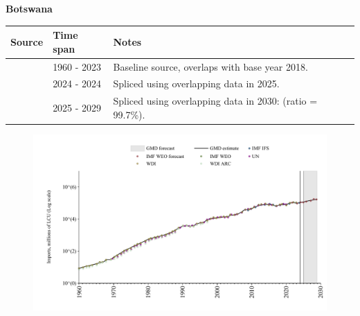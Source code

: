 \documentclass[12pt,a4paper,landscape]{article}
\begin{document}
\begin{adjustbox}{max totalsize={\paperwidth}{\paperheight},center}
\begin{minipage}[t][\textheight][t]{\textwidth}
\vspace*{0.5cm}
{}
\begin{center}
{\Large\bfseries Botswana}
\end{center}
\vspace{0.5cm}
\begin{table}[H]
\centering
\small
\begin{tabular}{|l|l|l|}
\hline
\textbf{Source} & \textbf{Time span} & \textbf{Notes} \\
\hline
\rowcolor{white}\cite{WDI}& 1960 - 2023 &Baseline source, overlaps with base year 2018.\\
\rowcolor{lightgray}\cite{IMF_IFS}& 2024 - 2024 &Spliced using overlapping data in 2025.\\
\rowcolor{white}\cite{IMF_WEO_forecast}& 2025 - 2029 &Spliced using overlapping data in 2030: (ratio = 99.7\%).\\
\hline
\end{tabular}
\end{table}
\begin{figure}[H]
\centering
\includegraphics[width=\textwidth,height=0.6\textheight,keepaspectratio]{graphs/BWA_imports.pdf}
\end{figure}
\end{minipage}
\end{adjustbox}
\end{document}
